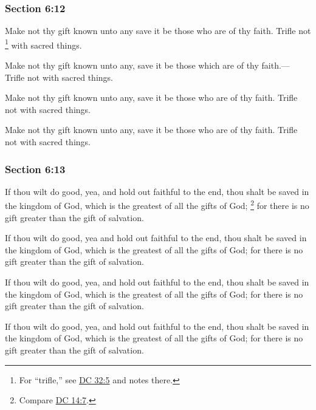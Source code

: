 	\subsubsection{Section 6:12} %
		\label{DC6-12}

		Make not thy gift known unto any save it be those who are of thy faith. Trifle not%
			\footnote{%
				For ``trifle,'' see \hyperref[DC32-5]{DC 32:5} and notes there.
				}
		with sacred things.

		\begin{framed}
		\scriptsize
			\begin{compactdesc}
				\item[JSP] Make not thy gift known unto any, save it be those which are of thy faith.--- Trifle not with sacred things.
				\item[DC 1835] Make not thy gift known unto any, save it be those who are of thy faith. Trifle not with sacred things.
				\item[DC 1844] Make not thy gift known unto any, save it be those who are of thy faith. Trifle not with sacred things.
			\end{compactdesc}
		\end{framed}

	\subsubsection{Section 6:13} %
		\label{DC6-13}

		If thou wilt do good, yea, and hold out faithful to the end, thou shalt be saved in the kingdom of God, which is the greatest of all the gifts of God;%
			\footnote{%
				Compare \hyperref[DC14-7]{DC 14:7}.
				}
		for there is no gift greater than the gift of salvation.

		\begin{framed}
		\scriptsize
			\begin{compactdesc}
				\item[JSP] If thou wilt do good, yea and hold out faithful to the end, thou shalt be saved in the kingdom of God, which is the greatest of all the gifts of God; for there is no gift greater than the gift of salvation.
				\item[DC 1835] If thou wilt do good, yea, and hold out faithful to the end, thou shalt be saved in the kingdom of God, which is the greatest of all the gifts of God; for there is no gift greater than the gift of salvation.
				\item[DC 1844] If thou wilt do good, yea, and hold out faithful to the end, thou shalt be saved in the kingdom of God, which is the greatest of all the gifts of God; for there is no gift greater than the gift of salvation.
			\end{compactdesc}
		\end{framed}


